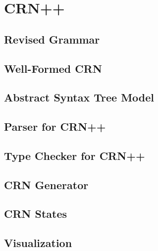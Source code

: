 \section{CRN++}

\subsection{Revised Grammar} %

\subsection{Well-Formed CRN} %

\subsection{Abstract Syntax Tree Model} %

\subsection{Parser for CRN++} %

\subsection{Type Checker for CRN++} %

\subsection{CRN Generator} %

\subsection{CRN States}

\subsection{Visualization} %